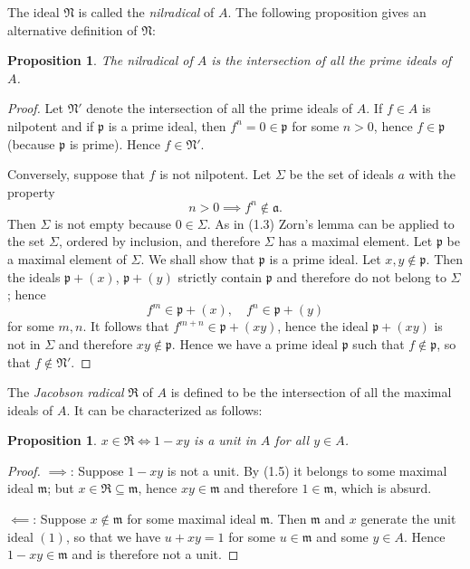 \documentclass[class=book, crop=false]{standalone}
\newtheorem{proposition}[theorem]{Proposition}
\theoremstyle{definition}
\theoremstyle{remark}
\begin{document}
The ideal $\mathfrak{N}$ is called the \textit{nilradical} of $A$. The following
proposition gives an alternative definition of $\mathfrak{N}$:

\begin{proposition}\label{prop:1.8}
  The nilradical of $A$ is the intersection of all the prime ideals of $A$.
\end{proposition}
\begin{proof}
  Let $\mathfrak{N}'$ denote the intersection of all the prime ideals of $A$. If
  $f \in A$ is nilpotent and if $\mathfrak{p}$ is a prime ideal, then
  $f^{n}=0 \in \mathfrak{p}$ for some $n>0$, hence $f \in \mathfrak{p}$ (because
  $\mathfrak{p}$ is prime). Hence $f \in \mathfrak{N}'$.

  Conversely, suppose that $f$ is not nilpotent. Let $\Sigma$ be the set of
  ideals $a$ with the property
  \[
    n>0 \implies f^{n} \notin \mathfrak{a}.
  \]
  Then $\Sigma$ is not empty because $0 \in \Sigma$. As in (1.3) Zorn's lemma
  can be applied to the set $\Sigma$, ordered by inclusion, and therefore
  $\Sigma$ has a maximal element. Let $\mathfrak{p}$ be a maximal element of
  $\Sigma$. We shall show that $\mathfrak{p}$ is a prime ideal. Let
  $x, y \notin \mathfrak{p}$. Then the ideals $\mathfrak{p}+(x)$,
  $\mathfrak{p}+(y)$ strictly contain $\mathfrak{p}$ and therefore do not belong
  to $\Sigma$; hence
  \[
    f^{m} \in \mathfrak{p}+(x), \quad f^{n} \in \mathfrak{p}+(y)
  \]
  for some $m, n$. It follows that $f^{m+n} \in \mathfrak{p}+(x y)$, hence the
  ideal $\mathfrak{p}+(x y)$ is not in $\Sigma$ and therefore
  $x y \notin \mathfrak{p}$. Hence we have a prime ideal $\mathfrak{p}$ such
  that $f \notin \mathfrak{p}$, so that $f \not\in\mathfrak{N}'$.
\end{proof}

The \textit{Jacobson radical} $\mathfrak{R}$ of $A$ is defined to be the intersection of
all the maximal ideals of $A$. It can be characterized as follows:
\begin{proposition}\label{prop:1.9}
  $x \in \mathfrak{R} \iff 1-x y$ is a unit in $A$ for all $y \in A$.
\end{proposition}
\begin{proof}
  $\implies$: Suppose $1-x y$ is not a unit. By (1.5) it belongs to some maximal
  ideal $\mathfrak{m}$; but $x \in \mathfrak{R} \subseteq \mathfrak{m}$, hence
  $x y \in \mathfrak{m}$ and therefore $1 \in \mathfrak{m}$, which is absurd.

  $\impliedby$: Suppose $x \notin \mathfrak{m}$ for some maximal ideal
  $\mathfrak{m}$. Then $\mathfrak{m}$ and $x$ generate the unit ideal $(1)$, so
  that we have $u+x y=1$ for some $u \in \mathfrak{m}$ and some $y \in A$. Hence
  $1-x y \in \mathfrak{m}$ and is therefore not a unit.
\end{proof}
\end{document}
